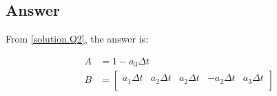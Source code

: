 \documentclass[titlepage,a4paper]{article}
\begin{document}
    \subsection{Answer}

    From \ref{solution.Q2}, the answer is:
    
    \begin{equation}
        \begin{aligned}
            A &=1-a_3 \Delta t \\
            B &=
            \begin{bmatrix}
                a_1 \Delta t & a_2 \Delta t & a_2 \Delta t & -a_2 \Delta t & a_3 \Delta t \\
            \end{bmatrix}
        \end{aligned}
    \end{equation}


\ifx \allfiles \undefined    
\end{document}
